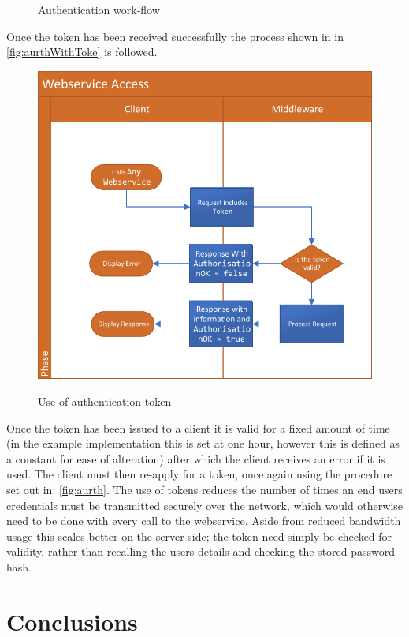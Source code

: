 \begin{figure}[!htbp]
\caption{Authentication work-flow}
\label{fig:aurth}
\end{figure}

Once the token has been received successfully the process shown in in \autoref{fig:aurthWithToke} is followed.

 \begin{figure}[!htbp]
\myfloatalign
{\includegraphics[width=\linewidth]{gfx/MiddlewareAurthenticationWithToken}} 
\caption{Use of authentication token}
\label{fig:aurthWithToke}
\end{figure}

Once the token has been issued to a client it is valid for a fixed amount of time (in the example implementation this is set at one hour, however this is defined as a constant for ease of alteration) after which the client receives an error if it is used. The client must then re-apply for a token, once again using the procedure set out in: \autoref{fig:aurth}. The use of tokens reduces the number of times an end users credentials must be transmitted securely over the network, which would otherwise need to be done with every call to the webservice. Aside from reduced bandwidth usage this scales better on the server-side; the token need simply be checked for validity, rather than recalling the users details and checking the stored password hash.

\vfill
\section{Conclusions}

